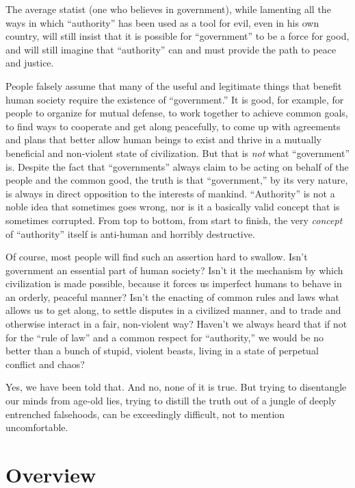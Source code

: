 \documentclass{book}
\begin{document}
The average statist (one who believes in government), while lamenting all the ways in which \enquote{authority} has been used as a tool for evil, even in his own country, will still insist that it is possible for \enquote{government} to be a force for good, and will still imagine that \enquote{authority} can and must provide the path to peace and justice.

People falsely assume that many of the useful and legitimate things that benefit human society require the existence of \enquote{government.} It is good, for example, for people to organize for mutual defense, to work together to achieve common goals, to find ways to cooperate and get along peacefully, to come up with agreements and plans that better allow human beings to exist and thrive in a mutually beneficial and non-violent state of civilization. But that is \emph{not} what \enquote{government} is. Despite the fact that \enquote{governments} always claim to be acting on behalf of the people and the common good, the truth is that \enquote{government,} by its very nature, is always in direct opposition to the interests of mankind. \enquote{Authority} is not a noble idea that sometimes goes wrong, nor is it a basically valid concept that is sometimes corrupted. From top to bottom, from start to finish, the very \emph{concept} of \enquote{authority} itself is anti-human and horribly destructive.

Of course, most people will find such an assertion hard to swallow. Isn't government an essential part of human society? Isn't it the mechanism by which civilization is made possible, because it forces us imperfect humans to behave in an orderly, peaceful manner? Isn't the enacting of common rules and laws what allows us to get along, to settle disputes in a civilized manner, and to trade and otherwise interact in a fair, non-violent way? Haven't we always heard that if not for the \enquote{rule of law} and a common respect for \enquote{authority,} we would be no better than a bunch of stupid, violent beasts, living in a state of perpetual conflict and chaos?

Yes, we have been told that. And no, none of it is true. But trying to disentangle our minds from age-old lies, trying to distill the truth out of a jungle of deeply entrenched falsehoods, can be exceedingly difficult, not to mention uncomfortable.

\section{Overview}
\end{document}
